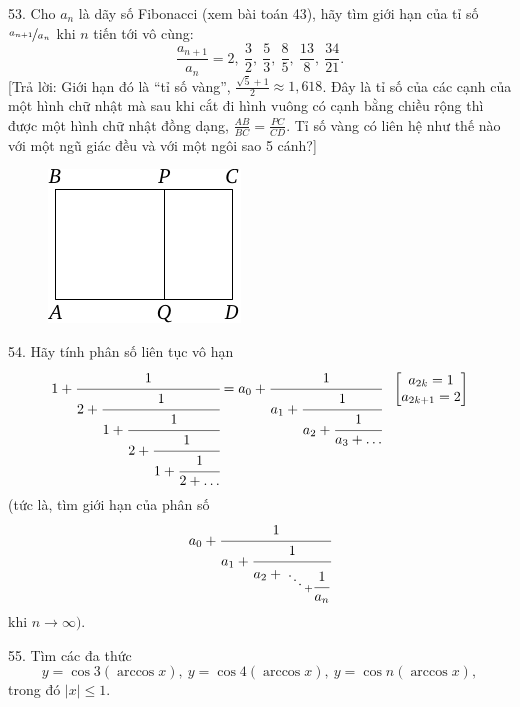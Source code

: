 \begin{problem}{53.}
	Cho $a_n$ là dãy số Fibonacci (xem bài toán 43), hãy tìm giới hạn của tỉ số $\nicefrac{a_{n+1}}{a_n}$ khi $n$ tiến tới vô cùng:
	\begin{equation*}
		\frac{a_{n+1}}{a_n}=2,\ \frac 32,\ \frac53, \ \frac85, \ \frac{13}8,
		\ \frac{34}{21}.
	\end{equation*}
	[Trả lời: Giới hạn đó là \enquote{tỉ số vàng}, $\frac{\sqrt{5}+1}{2}\approx 1,618$. Đây là tỉ số của các cạnh của một hình chữ nhật mà sau khi cắt đi hình vuông có cạnh bằng chiều rộng thì được một hình chữ nhật đồng dạng, $\frac{AB}{BC}=\frac{PC}{CD}$. Tỉ số vàng có liên hệ như thế nào với một ngũ giác đều và với một ngôi sao 5 cánh?]
	\begin{figure}
		\includegraphics{resources/taskbook-37}
	\end{figure}
\end{problem}

\begin{problem}{54.}
	Hãy tính phân số liên tục vô hạn
	\begin{equation*}
		1+\cfrac{1}{2+\cfrac{1}{1+\cfrac{1}{2+\cfrac{1}{1+\cfrac{1}{2+\ldots}}}}}=
		a_0+\cfrac{1}{a_1+\cfrac{1}{a_2+\cfrac{1}{a_3+\dots}}}
		\quad
		\left[\begin{matrix} a_{2k}=1\\a_{2k+1}=2\end{matrix}\right]
	\end{equation*}
	(tức là, tìm giới hạn của phân số
	\begin{equation*}
		a_0+\cfrac{1}{a_1+\cfrac{1}{a_2+{\atop{\ddots \atop {}} + \cfrac{1}{a_n}}}}
	\end{equation*}
	khi $n\rightarrow \infty)$.
\end{problem}

\begin{problem}{55.}
	Tìm các đa thức
	\begin{equation*}
		y=\cos 3 (\arccos x),\ y=\cos 4 (\arccos x),\
		y=\cos n (\arccos x),
	\end{equation*}
	trong đó $|x| \leqslant 1$.
\end{problem}

